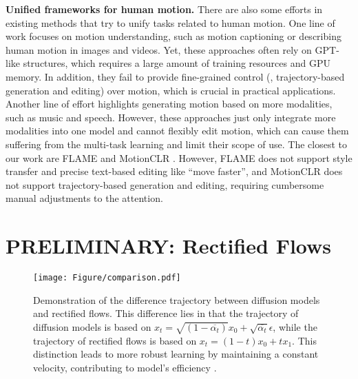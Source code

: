 \noindent\textbf{Unified frameworks for human motion.} There are also some efforts in existing methods that try to unify tasks related to human motion. One line of work \cite{jiang2023motiongpt,jiang2025motionchain,zhou2024avatargpt,li2024unimotion,wang2024motiongpt,ling2024motionllama,wu2024motionllm,luo2024m,athanasiou2024motionfix} focuses on motion understanding, such as motion captioning or describing human motion in images and videos. Yet, these approaches often rely on GPT-like structures, which requires a large amount of training resources and GPU memory. In addition, they fail to provide fine-grained control (\eg, trajectory-based generation and editing) over motion, which is crucial in practical applications. Another line of effort \cite{shrestha2025generating,zhou2023ude,zhou2023unified,zhang2025large,yang2024unimumo,luo2024m,fan2024everything2motion,alexanderson2023listen} highlights generating motion based on more modalities, such as music and speech. However, these approaches just only integrate more modalities into one model and cannot flexibly edit motion, which can cause them suffering from the multi-task learning and limit their scope of use. The closest to our work are FLAME \cite{kim2023flame} and MotionCLR \cite{chen2024motionclr}.
However, FLAME does not support style transfer and precise text-based editing like ``move faster'', and MotionCLR does not support trajectory-based generation and editing, requiring cumbersome manual adjustments to the attention.

\section{PRELIMINARY: Rectified Flows}

\begin{figure}[!h]
  \centering
  \texttt{[image: Figure/comparison.pdf]}
  \caption{Demonstration of the difference trajectory between diffusion models and rectified flows. This difference lies in that the trajectory of diffusion models is based on $x_t = \sqrt{(1-\overline{\alpha_t})} x_0 + \sqrt{\overline{\alpha_t}} \epsilon$, while the trajectory of rectified flows is based on $x_t = (1-t)x_0 + tx_1$. This distinction leads to more robust learning by maintaining a constant velocity, contributing to model's efficiency \cite{zhao2024flowturbo}. }
  \label{fig:comparison}
\end{figure} 

